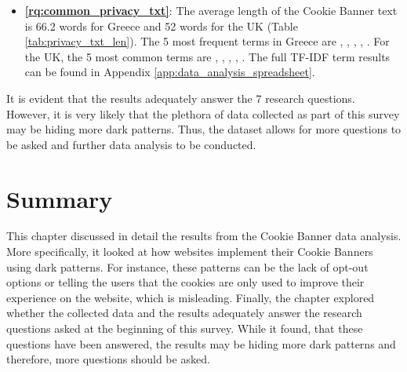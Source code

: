 \documentclass[../main.tex]{subfiles}
\begin{document}
\begin{itemize}
    \item \textbf{\ref{rq:common_privacy_txt}}: The average length of the Cookie Banner text is 66.2 words for Greece and 52 words for the UK (Table \ref{tab:privacy_txt_len}). The 5 most frequent terms in Greece are , , , , . For the UK, the 5 most common terms are , , , , . The full TF-IDF term results can be found in Appendix \ref{app:data_analysis_spreadsheet}.
\end{itemize}

It is evident that the results adequately answer the 7 research questions. However, it is very likely that the plethora of data collected as part of this survey may be hiding more dark patterns. Thus, the dataset allows for more questions to be asked and further data analysis to be conducted. 

\section{Summary}
This chapter discussed in detail the results from the Cookie Banner data analysis. More specifically, it looked at how websites implement their Cookie Banners using dark patterns. For instance, these patterns can be the lack of opt-out options or telling the users that the cookies are only used to improve their experience on the website, which is misleading. Finally, the chapter explored whether the collected data and the results adequately answer the research questions asked at the beginning of this survey. While it found, that these questions have been answered, the results may be hiding more dark patterns and therefore, more questions should be asked.
\end{document}
